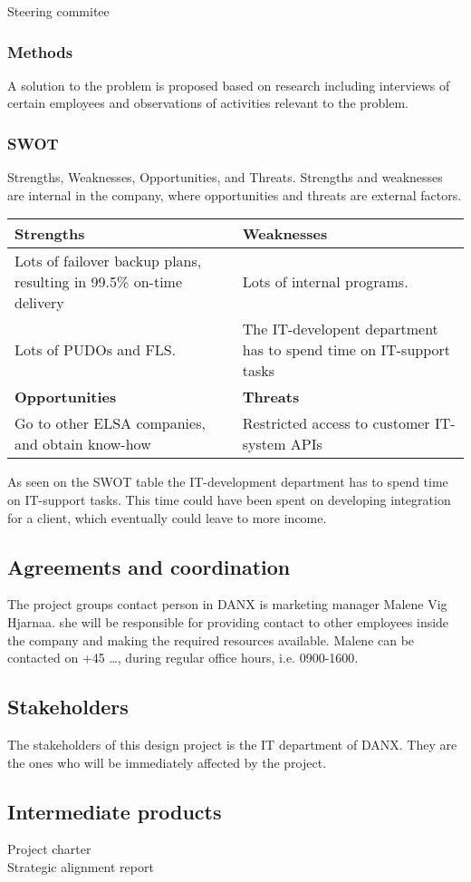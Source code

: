 Steering commitee

\subsubsection{Methods}
A solution to the problem is proposed based on research including interviews of certain employees and observations of activities relevant to the problem.


\subsubsection{SWOT}
Strengths, Weaknesses, Opportunities, and Threats.
Strengths and weaknesses are internal in the company, where opportunities and threats are external factors.

\begin{table}[htdp]
\label{SWOT analysis}
\begin{tabular}{| p{} | p{} |}
\hline
\rowcolor{GR}
\textbf{Strengths} & \textbf{Weaknesses} \\ \hline \hline
Lots of failover backup plans, resulting in 99.5\% on-time delivery & Lots of internal programs.
\\ \hline
Lots of PUDOs and FLS. & The IT-developent department has to spend time on IT-support tasks \\ \hline \hline
\rowcolor{GR}
\textbf{Opportunities} & \textbf{Threats} \\ \hline
Go to other ELSA companies, and obtain know-how & Restricted access to customer IT-system APIs \\ \hline
\end{tabular}
\end{table}

As seen on the SWOT table the IT-development department has to spend time on IT-support tasks. This time could have been spent on developing integration for a client, which eventually could leave to more income.

\subsection{Agreements and coordination}
The project groups contact person in DANX is marketing manager Malene Vig Hjarnaa. she will be responsible for providing contact to other employees inside the company and making the required resources available. Malene can be contacted on +45 …, during regular office hours, i.e. 0900-1600.

\subsection{Stakeholders}
The stakeholders of this design project is the IT department of DANX. They are the ones who will be immediately affected by the project.

\subsection{Intermediate products}
\begin{description}
	\item[Project charter] 
	\item[Strategic alignment report] 
	\end{description}